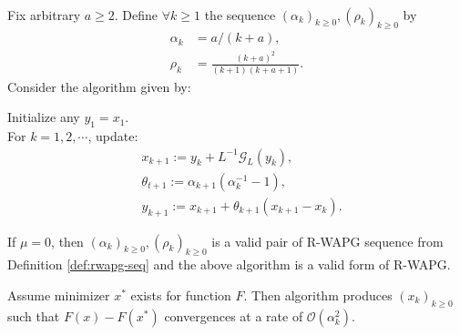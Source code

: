 \documentclass[12pt]{article}
\begin{document}
        \begin{theorem}\label{thm:r-wapg-on-cham-doss}\;\\
            Fix arbitrary $a \ge 2$.
            Define $\forall k \ge 1$ the sequence $(\alpha_k)_{k \ge 0}, (\rho_k)_{k \ge 0}$ by 
            \begin{align*}
                \alpha_k &= a/(k + a), 
                \\
                \rho_k &= \frac{(k + a)^2}{(k + 1)(k + a + 1)}. 
            \end{align*}
            Consider the algorithm given by: 
            \begin{tcolorbox}
                Initialize any $y_1 = x_1$. 
                \\
                For $k = 1, 2, \cdots$, update: 
                \begin{align*}
                    & x_{k + 1} := y_k + L^{-1}\mathcal G_L(y_k), 
                    \\
                    & \theta_{t + 1} := \alpha_{k + 1}(\alpha_k^{-1} - 1),
                    \\
                    & y_{k + 1} := x_{k + 1} + \theta_{k + 1}(x_{k + 1} - x_k). 
                \end{align*}    
            \end{tcolorbox}
            If $\mu = 0$, then $(\alpha_k)_{k \ge 0}, (\rho_k)_{k \ge 0}$ is a valid pair of R-WAPG sequence from Definition \ref{def:rwapg-seq} and the above algorithm is a valid form of R-WAPG. 
            \par
            Assume minimizer $x^*$ exists for function $F$. 
            Then algorithm produces $(x_k)_{k \ge0}$ such that $F(x) - F(x^*)$ convergences at a rate of $\mathcal O(\alpha_k^2)$. 
        \end{theorem}
\end{document}
